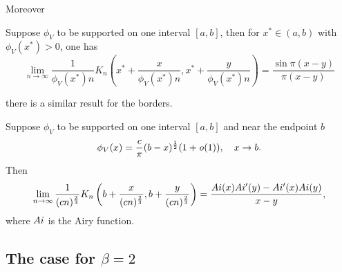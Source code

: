 Moreover

\begin{teorema}
	Suppose $\phi_V$ to be supported on one interval $[a,b]$, then for $x^* \in (a, b)$ with $\phi_V(x^*) > 0$, one has
	\begin{equation}
		\lim_{n \rightarrow \infty} \frac{1}{\phi_V(x^*) n} K_n\left(x^* + \frac{x}{\phi_V(x^*)n}, x^* + \frac{y}{\phi_V(x^*)n}\right) = \frac{\sin \pi(x - y)}{\pi(x - y)}
	\end{equation}
\end{teorema}
there is a similar result for the borders.
\begin{teorema}
	Suppose $\phi_V$ to be supported on one interval $[a,b]$ and near the endpoint $b$
	\begin{equation}
		\phi_V(x) = \frac{c}{\pi} (b-x)^{\frac{1}{2}} (1 + \mathit{o}{(1)}), \quad x \rightarrow b.
	\end{equation}
	Then
	\begin{equation}
		\lim_{n \rightarrow \infty} \frac{1}{(cn)^{\frac{2}{3}}} K_n\left(b + \frac{x}{(cn)^{\frac{2}{3}}}, b + \frac{y}{(cn)^{\frac{2}{3}}}\right) = \frac{Ai(x) Ai'(y) - Ai'(x) Ai(y)}{x - y},
	\end{equation}
	where $Ai$ is the Airy function.
\end{teorema}


\subsection{The case for $\beta = 2$}
\label{Subsection: The case for beta 2}

